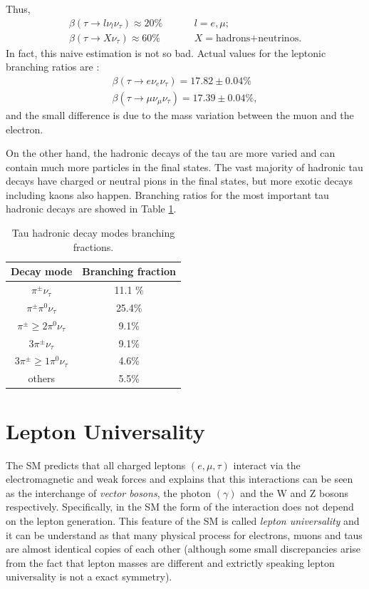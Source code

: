 Thus, 
\begin{align}
\beta(\tau\to l\nu_l\nu_\tau)\approx 20\%& \hspace{1cm}l=e,\mu;
\\
\beta(\tau\to X\nu_\tau)\approx 60\%& \hspace{1cm} X=\text{hadrons+neutrinos}.
\end{align}
In fact, this naive estimation is not so bad. Actual values for the leptonic branching ratios are \cite{PhysRevD.98.030001}:
\begin{align}
\beta(\tau\to e\nu_e\nu_\tau)=17.82\pm 0.04\%
\label{eq6}
\\
\beta(\tau\to \mu\nu_\mu\nu_\tau)=17.39\pm 0.04\%,
\end{align}
and the small difference is due to the mass variation between the muon and the electron.

On the other hand, the hadronic decays of the tau are more varied and can contain much more particles in the final states. The vast majority of hadronic tau decays have charged or neutral pions in the final states, but more exotic decays including kaons also happen. Branching ratios for the most important tau hadronic decays are showed in Table \ref{Table1}.
\begin{table}[]
	\centering
\begin{tabular}{|c|c|}
	\hline
	Decay mode                     & Branching fraction \\ \hline
	$\pi^\pm \nu_\tau$             & 11.1 \%            \\ \hline
	$\pi^\pm \pi^0 \nu_\tau$       & 25.4\%             \\ \hline
	$\pi^\pm \geq 2\pi^0 \nu_\tau$ & 9.1\%               \\ \hline
	$3\pi^\pm \nu_\tau$            & 9.1\%               \\ \hline
	$3\pi^\pm \geq 1\pi^0 \nu_\tau$& 4.6\%               \\ \hline
	others						   & 5.5\%               \\ \hline
\end{tabular}
	\caption{Tau hadronic decay modes branching fractions.}
	\label{Table1}
\end{table}
\section{Lepton Universality}\label{chap2sec2}
The SM predicts that all charged leptons $(e,\mu,\tau)$ interact via the electromagnetic and weak forces and explains that this interactions can be seen as the interchange of \textit{vector bosons}, the photon $(\gamma)$ and the W and Z bosons respectively. Specifically, in the SM the form of the interaction does not depend on the lepton generation. This feature of the SM is called \textit{lepton universality} and it can be understand as that many physical process for electrons, muons and taus are almost identical copies of each other (although some small discrepancies arise from the fact that lepton masses are different and extrictly speaking lepton universality is not a exact symmetry). 

